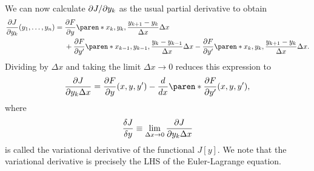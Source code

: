 \documentclass[11pt]{penrose}
\begin{document}
We can now calculate $\partial J / \partial y_k$ as the usual partial derivative to obtain
\begin{align*}
    \frac{\pd J}{\pd y_k} (y_1, \dots, y_n)
    = {} & \frac{\pd F}{\pd y} \paren*{x_k, y_k, \frac{y_{k+1} - y_k}{\Delta x}} \Delta x\\
    &+ \frac{\pd F}{\pd y'} \paren*{x_{k-1}, y_{k-1}, \frac{y_k - y_{k-1}}{\Delta x}} \Delta x
    - \frac{\pd F}{\pd y'} \paren*{x_k, y_k, \frac{y_{k+1} - y_k}{\Delta x}} \Delta x.
\end{align*}
Dividing by $\Delta x$ and taking the limit $\Delta x \to 0$ reduces this expression to
\begin{equation}
    \frac{\pd J}{\pd y_k \Delta x}
    = \frac{\pd F}{\pd y} (x, y, y')
    - \frac{d}{dx} \paren*{ \frac{\pd F}{\pd y'} (x, y, y') },
\end{equation}
where
\begin{equation}
    \frac{\delta J}{\delta y} \equiv \lim_{\Delta x \to 0} \frac{\partial J}{\partial y_k \Delta x}
\end{equation}
is called the variational derivative of the functional $J[y]$. We note that the variational derivative is precisely the LHS of the Euler-Lagrange equation.
\end{document}
